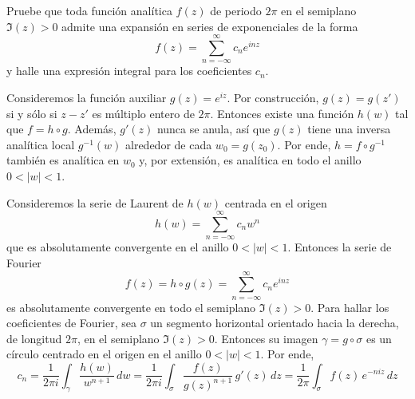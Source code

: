 \begin{exercise}
Pruebe que toda función analítica $f(z)$ de periodo $2\pi$ en el semiplano $\Im(z) > 0$ admite una expansión en series de exponenciales de la forma
$$f(z) = \sum_{n=-\infty}^\infty c_n e^{inz}$$
y halle una expresión integral para los coeficientes $c_n$.
\end{exercise}

\begin{solution}
Consideremos la función auxiliar $g(z) = e^{iz}$. Por construcción, $g(z) = g(z')$ si y sólo si $z - z'$ es múltiplo entero de $2\pi$. Entonces existe una función $h(w)$ tal que $f = h \circ g$. Además, $g'(z)$ nunca se anula, así que $g(z)$ tiene una inversa analítica local $g^{-1}(w)$ alrededor de cada $w_0 = g(z_0)$. Por ende, $h = f \circ g^{-1}$ también es analítica en $w_0$ y, por extensión, es analítica en todo el anillo $0 < |w| < 1$.

Consideremos la serie de Laurent de $h(w)$ centrada en el origen
$$h(w) = \sum_{n=-\infty}^\infty c_n w^n$$
que es absolutamente convergente en el anillo $0 < |w| < 1$. Entonces la serie de Fourier
$$f(z) = h \circ g(z) = \sum_{n=-\infty}^\infty c_n e^{inz}$$
es absolutamente convergente en todo el semiplano $\Im(z) > 0$. Para hallar los coeficientes de Fourier, sea $\sigma$ un segmento horizontal orientado hacia la derecha, de longitud $2\pi$, en el semiplano $\Im(z) > 0$. Entonces su imagen $\gamma = g \circ \sigma$ es un círculo centrado en el origen en el anillo $0 < |w| < 1$. Por ende,
$$
c_n
    = \frac 1 {2\pi i} \int_\gamma \frac {h(w)} {w^{n+1}} \, dw
    = \frac 1 {2\pi i} \int_\sigma \frac {f(z)} {g(z)^{n+1}} \, g'(z) \, dz
    = \frac 1 {2\pi} \int_\sigma f(z) \, e^{-niz} \, dz
$$
\end{solution}
